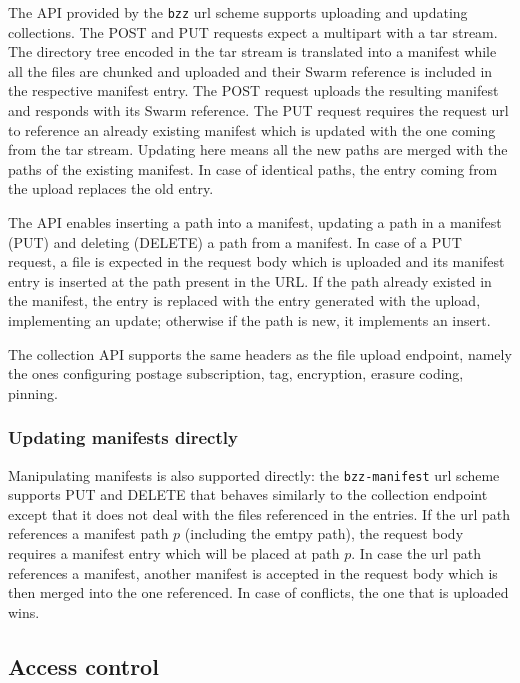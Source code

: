 The API provided by the \texttt{bzz} url scheme supports uploading and updating collections. The POST and PUT requests expect a multipart with a tar stream. The directory  tree encoded in the tar stream is translated into a manifest while all the files are chunked and uploaded and their Swarm reference is included in the respective manifest entry. The POST request uploads the resulting manifest and responds with its Swarm reference. The PUT request requires the request url to reference an already existing manifest which is updated with the one coming from the tar stream. Updating here means all the new paths are merged with the paths of the existing  manifest. In case of identical paths, the entry coming from the upload replaces the old entry.

The API enables inserting a path into a manifest, updating a path in a manifest (PUT) and deleting (DELETE) a path from a manifest. In case of a PUT request, a file is expected in the request body which is uploaded and its manifest entry is inserted at the path present in the URL. If the path already existed in the manifest, the entry is replaced with the entry generated with the upload, implementing an update; otherwise if the path is new, it implements an insert. 

The collection API supports the same headers as the file upload endpoint, namely the ones configuring postage subscription, tag, encryption, erasure coding, pinning.

\subsubsection{Updating manifests directly}

Manipulating manifests is also supported directly: the \texttt{bzz-manifest} url scheme supports PUT and DELETE that behaves similarly to the collection endpoint except that it does not deal with the files referenced in the entries. If the url path references a manifest path $p$ (including the emtpy path), the request body requires a manifest entry which will be placed at path $p$. In case the url path references a manifest, another manifest is accepted in the request body which is then merged into the one referenced. In case of conflicts, the one that is uploaded wins. 


\subsection{Access control}\label{sec:access-control-ux}

